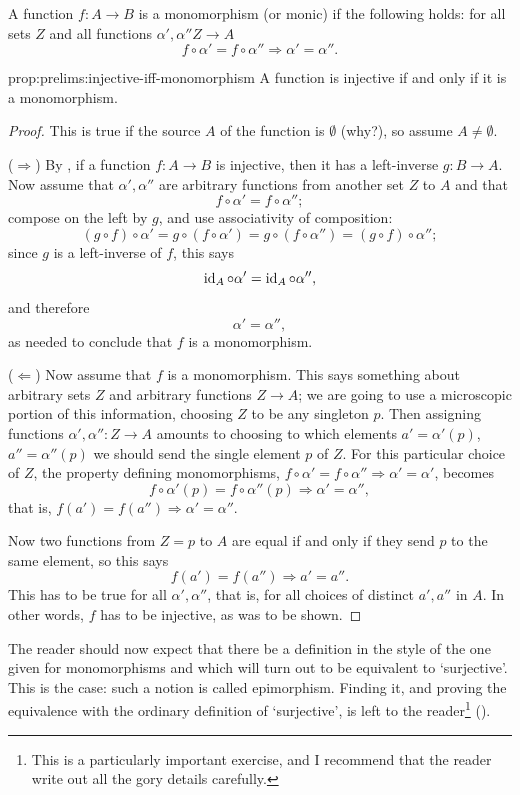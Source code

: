 A function $f : A \to B$ is a monomorphism (or monic) if the following
holds: for all sets $Z$ and all functions $\alpha', \alpha'' Z \to A$
\[f \circ \alpha' = f \circ \alpha'' \Rightarrow \alpha' = \alpha''.\]
\begin{prop}{}{prop:prelims:injective-iff-monomorphism}
  A function is injective if and only if it is a monomorphism.
\end{prop}
\begin{proof}
  This is true if the source $A$ of the function is $\emptyset$
  (why?), so assume $A \neq \emptyset$.

  ($\Rightarrow$) By , if a function
  $f : A \to B$ is injective, then it has a left-inverse
  $g : B \to A$. Now assume that $\alpha' ,\alpha''$ are arbitrary
  functions from another set $Z$ to $A$ and that
  \[f \circ \alpha' = f \circ \alpha'' ;\] compose on the left by $g$,
  and use associativity of composition:
  \[(g \circ f ) \circ \alpha' = g \circ (f \circ \alpha') = g \circ
    (f \circ \alpha'' ) = (g \circ f ) \circ \alpha'' ;\] since $g$ is
  a left-inverse of $f$, this says
  \[\operatorname{id}_A \circ \alpha' = \operatorname{id}_A \circ \alpha'',\]
  and therefore
  \[\alpha' = \alpha'',\]
  as needed to conclude that $f$ is a monomorphism.

  ($\Leftarrow$) Now assume that $f$ is a monomorphism. This says
  something about arbitrary sets $Z$ and arbitrary functions
  $Z \to A$; we are going to use a microscopic portion of this
  information, choosing $Z$ to be any singleton ${p}$. Then assigning
  functions $\alpha' , \alpha'' : Z \to A$ amounts to choosing to
  which elements $a' = \alpha ' (p)$, $a'' = \alpha''(p)$ we should
  send the single element $p$ of $Z$. For this particular choice of
  $Z$, the property defining monomorphisms,
  $f \circ \alpha' = f \circ \alpha'' \Rightarrow \alpha ' = \alpha'$,
  becomes
  \[f \circ \alpha'(p) = f \circ \alpha'' (p) \Rightarrow \alpha' =
    \alpha'',\] that is,
  $f (a') = f (a'') \Rightarrow \alpha' = \alpha''$.

  Now two functions from $Z = {p}$ to $A$ are equal if and only if
  they send $p$ to the same element, so this says
  \[f (a') = f (a'') \Rightarrow a' = a'' .\] This has to be true for
  all $\alpha', \alpha''$, that is, for all choices of distinct
  $a', a''$ in $A$.  In other words, $f$ has to be injective, as was
  to be shown.
\end{proof}
The reader should now expect that there be a definition in the style
of the one given for monomorphisms and which will turn out to be
equivalent to `surjective'.  This is the case: such a notion is called
epimorphism. Finding it, and proving the equivalence with the ordinary
definition of `surjective', is left to the reader\footnote{This is a
  particularly important exercise, and I recommend that the reader
  write out all the gory details carefully.}
().


